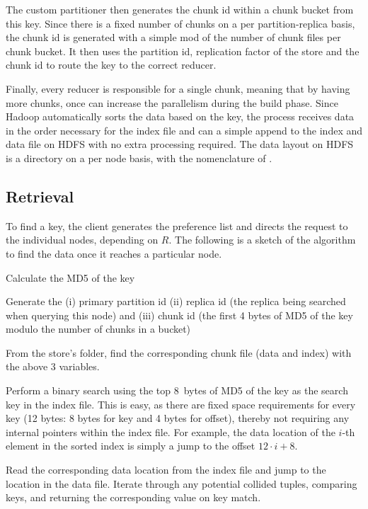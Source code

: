 The custom partitioner then generates the chunk id within a chunk
bucket from this key. Since there is a fixed number of chunks on a 
per partition-replica basis, the chunk id is generated with a 
simple mod of the number of chunk files per chunk bucket. 
It then uses the partition id, replication factor of the store and 
the chunk id to route the key to the correct reducer. 

Finally, every reducer is responsible for a single chunk, 
meaning that by having more chunks, once can increase
the parallelism during the build phase. Since Hadoop automatically
sorts the data based on the key, the process receives data in the
order necessary for the index file and can a simple append 
to the index and data file on HDFS with no extra processing required.
The data layout on HDFS is a directory on a per \projectname{} node
basis, with the nomenclature of .


\subsection{Retrieval}
\label{sec:read_only:search}

To find a key, the client generates the preference list and directs
the request to the individual nodes, depending on $R$. 
The following is a sketch of the algorithm to find the data once it
reaches a particular node.

\begin{compactenum}
  \item Calculate the MD5 of the key
  \item Generate the (i) primary partition id (ii) replica id (the replica being
searched when querying this node) and (iii) chunk id (the first 4 bytes of
MD5 of the key modulo the number of chunks in a bucket)
  \item From the store's folder, find the corresponding chunk file 
(data and index) with the above 3 variables.
  \item Perform a binary search using the top 8~bytes of MD5 of the
key as the search key in the index file. This is easy, as there are
fixed space requirements for every key (12 bytes: 8 bytes for key and
4 bytes for offset), thereby not requiring any internal pointers
within the index file. For example, the data location of the $i$-th
element in the sorted index is simply a jump to
the offset $12 \cdot i + 8$.  
  \item Read the corresponding data location from the index file
and jump to the location in the data file. Iterate through any 
potential collided tuples, comparing keys, and returning the 
corresponding value on key match. 
\end{compactenum}


